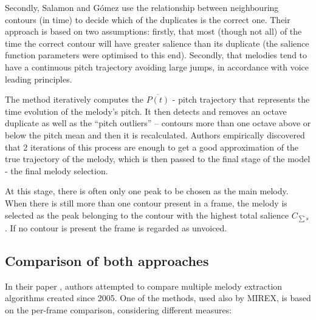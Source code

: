 Secondly, Salamon and G\'{o}mez use the relationship between neighbouring contours (in time) to decide which of the duplicates is the correct one. Their approach is based on two assumptions: firstly, that most (though not all) of the time the correct contour will have greater salience than its duplicate (the salience function parameters were optimised to this end). Secondly, that melodies tend to have a continuous pitch trajectory avoiding large jumps, in accordance with voice leading principles.

The method iteratively computes the $\overline{P(t)}$ - pitch trajectory that represents the time evolution of the melody's pitch.
It then detects and removes an octave duplicate as well as  the ``pitch outliers'' – contours more than one octave above or below the pitch mean and then it is recalculated. Authors empirically discovered that 2 iterations of this process are enough to get a good approximation of the true trajectory of the melody, which is then passed to the final stage of the model - the final melody selection.

At this stage, there is often only one peak to be chosen as the main melody. When there is still more than one contour present in a frame, the melody is selected as the peak belonging to the contour with the highest total salience $C_{\sum s}$. If no contour is present the frame is regarded as unvoiced.

\vspace{10pt}


\subsection{Comparison of both approaches}

In their paper \cite{comparison}, authors attempted to compare multiple melody extraction algorithms created since 2005. One of the methods, used also by MIREX, is based on the per-frame comparison, considering different measures:


